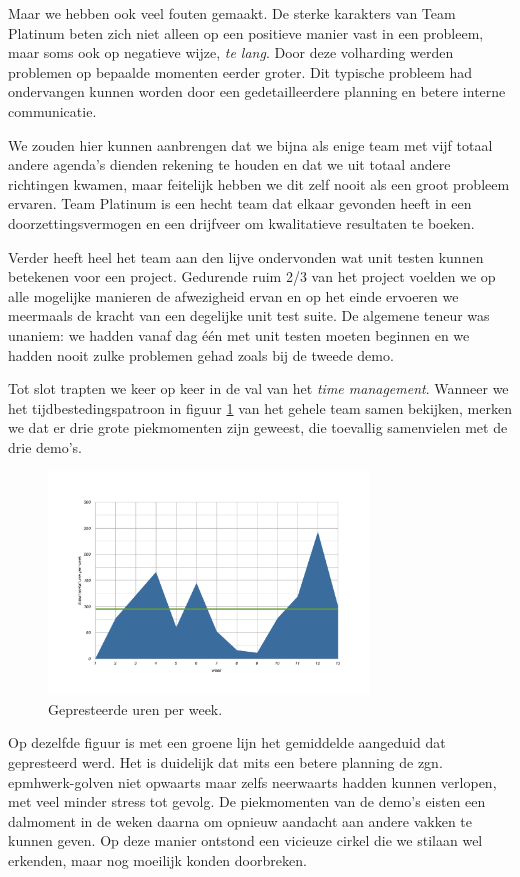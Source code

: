 \documentclass[12pt,a4paper]{report}
\begin{document}
Maar we hebben ook veel fouten gemaakt. De sterke karakters van Team Platinum beten zich niet alleen op een positieve manier vast in een probleem, maar soms ook op negatieve wijze, \emph{te lang}. Door deze volharding werden problemen op bepaalde momenten eerder groter. Dit typische probleem had ondervangen kunnen worden door een gedetailleerdere planning en betere interne communicatie.

We zouden hier kunnen aanbrengen dat we bijna als enige team met vijf totaal andere agenda's dienden rekening te houden en dat we uit totaal andere richtingen kwamen, maar feitelijk hebben we dit zelf nooit als een groot probleem ervaren. Team Platinum is een hecht team dat elkaar gevonden heeft in een doorzettingsvermogen en een drijfveer om kwalitatieve resultaten te boeken.

Verder heeft heel het team aan den lijve ondervonden wat unit testen kunnen betekenen voor een project. Gedurende ruim 2/3 van het project voelden we op alle mogelijke manieren de afwezigheid ervan en op het einde ervoeren we meermaals de kracht van een degelijke unit test suite. De algemene teneur was unaniem: we hadden vanaf dag \'e\'en met unit testen moeten beginnen en we hadden nooit zulke problemen gehad zoals bij de tweede demo.

Tot slot trapten we keer op keer in de val van het \emph{time management}. Wanneer we het tijdbestedingspatroon in figuur \ref{fig:effort} van het gehele team samen bekijken, merken we dat er drie grote piekmomenten zijn geweest, die toevallig samenvielen met de drie demo's. 

\begin{figure}[htbp]
  \centering
  \includegraphics[width=85mm]{resources/effort.pdf}
  \caption{Gepresteerde uren per week.}
  \label{fig:effort}
\end{figure}

Op dezelfde figuur is met een groene lijn het gemiddelde aangeduid dat gepresteerd werd. Het is duidelijk dat mits een betere planning de zgn.\\epmh{werk-golven} niet opwaarts maar zelfs neerwaarts hadden kunnen verlopen, met veel minder stress tot gevolg. De piekmomenten van de demo's eisten een dalmoment in de weken daarna om opnieuw aandacht aan andere vakken te kunnen geven. Op deze manier ontstond een vicieuze cirkel die we stilaan wel erkenden, maar nog moeilijk konden doorbreken.
\end{document}
